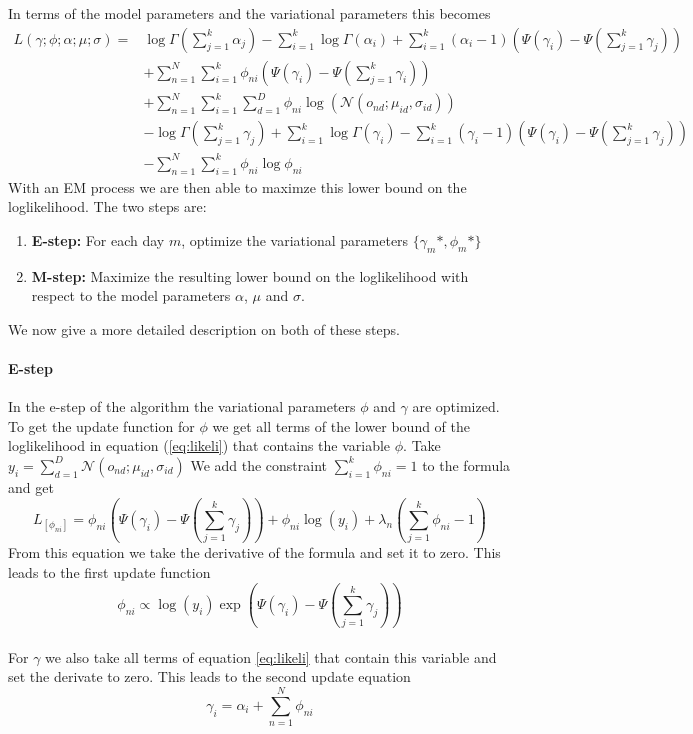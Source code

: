 \documentclass[11pt,a4paper]{article}
\begin{document}
In terms of the model parameters and the variational parameters this becomes
\begin{equation}
  \begin{split}
 L(\gamma;\phi;\alpha;\mu;\sigma) =& \log \Gamma (\sum_{j=1}^k \alpha_j) - \sum_{i=1}^k \log \Gamma(\alpha_i) + \sum_{i=1}^k (\alpha_i-1)(\Psi(\gamma_i)-\Psi(\sum_{j=1}^k \gamma_j)) \\
 & + \sum_{n=1}^N \sum_{i=1}^k \phi_{ni} (\Psi(\gamma_i)-\Psi(\sum_{j=1}^k \gamma_i)) \\
  & + \sum_{n=1}^N \sum_{i=1}^k \sum_{d=1}^D \phi_{ni} \log( \mathcal{N}(o_{nd};\mu_{id},\sigma_{id})) \\
  & - \log \Gamma (\sum_{j=1}^k \gamma_j) + \sum_{i=1}^k \log \Gamma (\gamma_i) - \sum_{i=1}^k (\gamma_i -1)(\Psi(\gamma_i)-\Psi(\sum_{j=1}^k \gamma_j)) \\
 & - \sum_{n=1}^N \sum_{i=1}^k \phi_{ni} \log \phi_{ni}
  \end{split}
  \label{eq:likeli}
\end{equation}
With an EM process we are then able to maximze this lower bound on the loglikelihood. The two steps are:
  \begin{enumerate}
   \item \textbf{E-step:} For each day $m$, optimize the variational parameters $\{ \gamma_{m}*,\phi_{m}* \}$
   \item \textbf{M-step:} Maximize the resulting lower bound on the loglikelihood with respect to the model parameters $\alpha$, $\mu$ and $\sigma$.
  \end{enumerate}
  
  We now give a more detailed description on both of these steps.
  
  \paragraph{E-step}
In the e-step of the algorithm the variational parameters $\phi$ and $\gamma$ are optimized. To get the update function for $\phi$ we get all terms of the lower bound of the loglikelihood in equation (\ref{eq:likeli}) that contains the variable $\phi$. 
Take $y_i=\sum_{d=1}^D \mathcal{N}(o_{nd};\mu_{id},\sigma_{id})$
We add the constraint $\sum_{i=1}^k \phi_{ni}=1 $ to the formula and get
\begin{equation}
 L_{[\phi_{ni}]} = \phi_{ni}(\Psi(\gamma_i)-\Psi(\sum_{j=1}^k \gamma_j)) + \phi_{ni} \log(y_i) + \lambda_n(\sum_{j=1}^k \phi_{ni} -1)
\end{equation}
From this equation we take the derivative of the formula and set it to zero. This leads to the first update function
\begin{equation}
 \phi_{ni} \propto \log(y_i) \exp(\Psi(\gamma_i) - \Psi(\sum_{j=1}^k \gamma_j))
\end{equation}
\\
For $\gamma$  we also take all terms of equation \ref{eq:likeli} that contain this variable and set the derivate to zero. This leads to the second update equation
\begin{equation}
 \gamma_i = \alpha_i + \sum_{n=1}^N \phi_{ni}
\end{equation}
\end{document}
